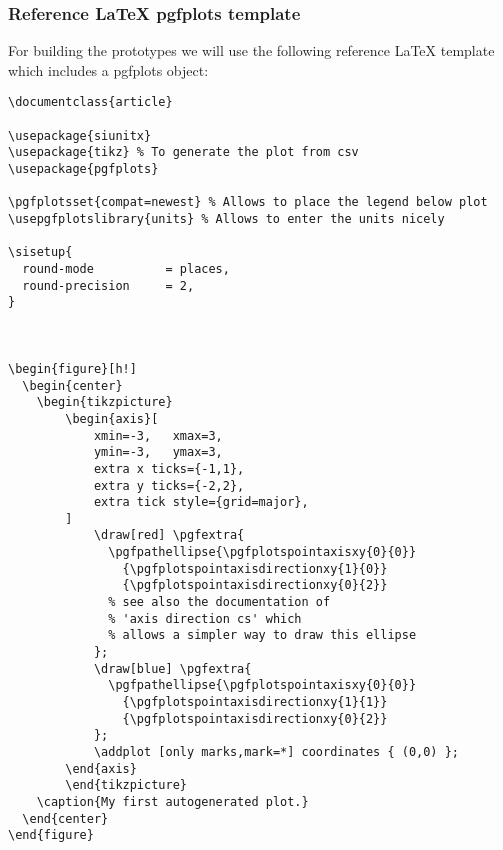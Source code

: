 \subsubsection{Reference LaTeX pgfplots template}\label{subsec:reference_latex_pgfplots_template}
For building the prototypes we will use the following reference LaTeX template which includes a pgfplots object:~\cite{pgfplots_gallery_sourceforge}

\begin{lstlisting}[caption={Reference LaTeX template with a pgfplots object},label={lst:reference_latex_pgfplots_template},language={[LaTeX]{TeX}}]
\documentclass{article}

\usepackage{siunitx}
\usepackage{tikz} % To generate the plot from csv
\usepackage{pgfplots}

\pgfplotsset{compat=newest} % Allows to place the legend below plot
\usepgfplotslibrary{units} % Allows to enter the units nicely

\sisetup{
  round-mode          = places,
  round-precision     = 2,
}



\begin{figure}[h!]
  \begin{center}
    \begin{tikzpicture}
        \begin{axis}[
            xmin=-3,   xmax=3,
            ymin=-3,   ymax=3,
            extra x ticks={-1,1},
            extra y ticks={-2,2},
            extra tick style={grid=major},
        ]
            \draw[red] \pgfextra{
              \pgfpathellipse{\pgfplotspointaxisxy{0}{0}}
                {\pgfplotspointaxisdirectionxy{1}{0}}
                {\pgfplotspointaxisdirectionxy{0}{2}}
              % see also the documentation of
              % 'axis direction cs' which
              % allows a simpler way to draw this ellipse
            };
            \draw[blue] \pgfextra{
              \pgfpathellipse{\pgfplotspointaxisxy{0}{0}}
                {\pgfplotspointaxisdirectionxy{1}{1}}
                {\pgfplotspointaxisdirectionxy{0}{2}}
            };
            \addplot [only marks,mark=*] coordinates { (0,0) };
        \end{axis}
        \end{tikzpicture}
    \caption{My first autogenerated plot.}
  \end{center}
\end{figure}


\end{lstlisting}

